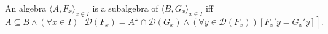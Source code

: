 An algebra $\langle A, F_x \rangle_{x \in I}$ is a subalgebra of $\langle B, G_x \rangle_{x \in I}$ iff
$$A \subseteq B \land (\forall x \in I) [\mathcal{D}(F_x) = A^\omega \cap \mathcal{D}(G_x) \land (\forall y \in \mathcal{D}(F_x)) [F_x' y = G_x' y]].$$
